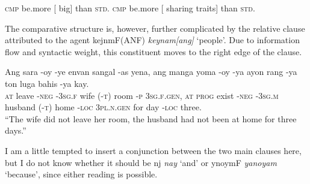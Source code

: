 \documentclass[12pt,paper=letter]{scrartcl}
\newcommand{\fw}[1]{\textit{#1}} %
\newcommand{\q}[1]{\enquote{#1}} %
\newcommand{\qq}[1]{\enquote*{#1}} %
\newcommand{\divider}{
    \vspace{\baselineskip}
}
\newcommand{\mor}[1]{\textsc{\lowercase{#1}}}
\newcommand{\ayr}[1]{{\Tagati #1}}
\begin{document}
\begin{exe}
    \begin{xlist}
	\ex \mor{CMP} be.more [\fakesubscript{\mor{QTY}} big] than \mor{STD}.
	\ex \mor{CMP} be.more [\fakesubscript{\mor{QTY}} sharing traits] than \mor{STD}.
    \end{xlist}
\end{exe}

The comparative structure is, however, further complicated by the relative 
clause attributed to the agent \ayr{kejnmF(ANF)} \fw{keynam[ang]} \qq{people}. 
Due to information flow and syntactic weight, this constituent moves to the 
right edge of the clause.

\divider

\begin{exe}  %
    \ex \gll Ang sara -oy -ye envan {} sangal -as yena, ang manga yoma -oy -ya 
	ayon {} rang -ya ton luga bahis -ya kay. \\
    \mor{AT} leave \mor{-NEG} \mor{-3SG.F} wife \mor{(-T)} room \mor{-P} 
    \mor{3SG.F.GEN}, \mor{AT} \mor{PROG} exist \mor{-NEG} \mor{-3SG.M} 
	husband \mor{(-T)} home \mor{-LOC} \mor{3PL.N.GEN} for day \mor{-LOC} 
	three. \\
    \glt \q{The wife did not leave her room, the husband had not been at home 
	for three days.}
\end{exe}

I am a little tempted to insert a conjunction between the two main clauses here,
but I do not know whether it should be \ayr{nj} \fw{nay} \qq{and} or \ayr{ynoymF}
\fw{yanoyam} \qq{because}, since either reading is possible.

\divider
\end{document}
